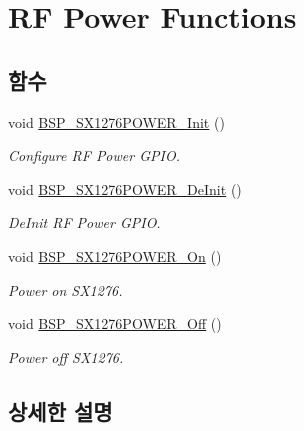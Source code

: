 \hypertarget{group___docking_station___r_f___power___functions}{}\section{RF Power Functions}
\label{group___docking_station___r_f___power___functions}
\subsection*{함수}
\begin{DoxyCompactItemize}
\item 
void \mbox{\hyperlink{group___docking_station___r_f___power___functions_ga46ccfec03200a24f3737fc8015e2d5f7}{B\+S\+P\+\_\+\+S\+X1276\+P\+O\+W\+E\+R\+\_\+\+Init}} ()
\begin{DoxyCompactList}\small\item\em Configure RF Power G\+P\+IO. \end{DoxyCompactList}\item 
void \mbox{\hyperlink{group___docking_station___r_f___power___functions_ga42c7cbbf0254f5f11135797d083bcb2c}{B\+S\+P\+\_\+\+S\+X1276\+P\+O\+W\+E\+R\+\_\+\+De\+Init}} ()
\begin{DoxyCompactList}\small\item\em De\+Init RF Power G\+P\+IO. \end{DoxyCompactList}\item 
void \mbox{\hyperlink{group___docking_station___r_f___power___functions_gaef6814f684bbf7fa47adda1abc4c1129}{B\+S\+P\+\_\+\+S\+X1276\+P\+O\+W\+E\+R\+\_\+\+On}} ()
\begin{DoxyCompactList}\small\item\em Power on S\+X1276. \end{DoxyCompactList}\item 
void \mbox{\hyperlink{group___docking_station___r_f___power___functions_ga0514aa0607414fb41ea7e37a58ce6307}{B\+S\+P\+\_\+\+S\+X1276\+P\+O\+W\+E\+R\+\_\+\+Off}} ()
\begin{DoxyCompactList}\small\item\em Power off S\+X1276. \end{DoxyCompactList}\end{DoxyCompactItemize}


\subsection{상세한 설명}


